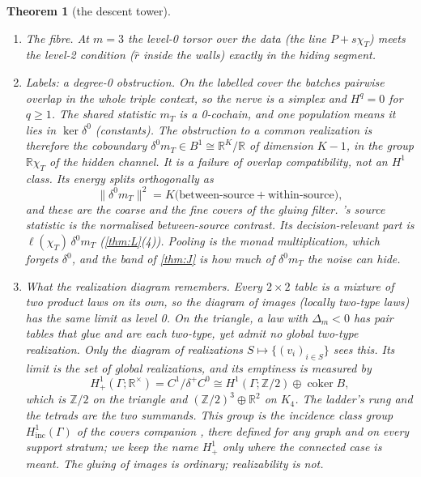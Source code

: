 \documentclass[11pt]{article}
\newtheorem{theorem}{Theorem}\renewcommand{\thetheorem}{\Alph{theorem}}
\theoremstyle{definition}\newtheorem{definition}{Definition}\newtheorem{remark}{Remark}
\begin{document}
\begin{theorem}[the descent tower]
\begin{enumerate}
  level, which is why a second triple detects what no pair check can (\cref{cor:secondtriple}).
\item[(5)] \emph{The fibre.} At $m=3$ the level-0 torsor over the data (the line $P+s\chi_T$) meets the level-2 condition ($\hat r$
  inside the walls) exactly in the hiding segment.
\item[(6)] \emph{Labels: a degree-0 obstruction.} On the labelled cover the batches pairwise overlap in the whole triple context, so
  the nerve is a simplex and $H^q=0$ for $q\ge1$. The shared statistic $m_T$ is a 0-cochain, and one population means it lies in $\ker\delta^0$
  (constants). The obstruction to a common realization is therefore the coboundary $\delta^0m_T\in B^1\cong\mathbb R^K/\mathbb R$ of
  dimension $K-1$, in the group $\mathbb R\chi_T$ of the hidden channel. It is a failure of overlap compatibility, \emph{not} an $H^1$
  class. Its energy splits orthogonally as
  \[
  \|\delta^0m_T\|^2=K\bigl(\text{between-source}+\text{within-source}\bigr),
  \]
  and these are the coarse and the fine covers of the gluing filter. 's source statistic is the normalised between-source
  contrast. Its decision-relevant part is $\ell(\chi_T)\,\delta^0m_T$ (\cref{thm:L}(4)). Pooling is the monad multiplication, which
  forgets $\delta^0$, and the band of \cref{thm:J} is how much of $\delta^0m_T$ the noise can hide.
\item[(7)] \emph{What the realization diagram remembers.} Every $2\times2$ table is a mixture of two product laws on its own, so the
  diagram of \emph{images} (locally two-type laws) has the same limit as level 0. On the triangle, a law with $\Delta_m<0$ has pair
  tables that glue and are each two-type, yet admit no global two-type realization. Only the diagram of \emph{realizations}
  $S\mapsto\{(v_i)_{i\in S}\}$ sees this. Its limit is the set of global realizations, and its emptiness is measured by
  \[
  H^1_+(\Gamma;\mathbb R^\times)=C^1/\delta^+C^0\cong H^1(\Gamma;\mathbb Z/2)\oplus\operatorname{coker}B,
  \]
  which is $\mathbb Z/2$ on the triangle and $(\mathbb Z/2)^3\oplus\mathbb R^2$ on $K_4$. The ladder's rung and the tetrads are the
  two summands. This group is the incidence class group $H^1_{\mathrm{inc}}(\Gamma)$ of the covers companion
  \cite[Section ``Stratified descent'']{CoversCompanion}, there defined for any graph and on every support stratum; we keep the
  name $H^1_+$ only where the connected case is meant. The gluing of images is ordinary; realizability is not.
\end{enumerate}
\end{theorem}
\end{document}

